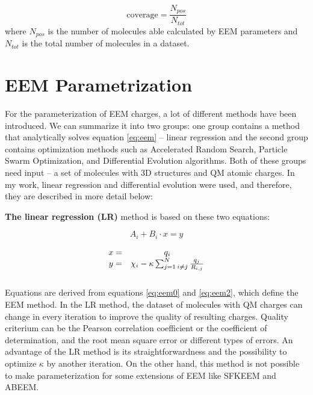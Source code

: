 \begin{equation}
    \mathrm{coverage} = \frac{N_{pos}}{N_{tot}}
\end{equation}
where $N_{pos}$ is the number of molecules able calculated by EEM parameters
and $N_{tot}$ is the total number of molecules in a dataset.

\section{EEM Parametrization}

For the parameterization of EEM charges, a lot of different methods have been
introduced. We can summarize it into two groups: one group contains
a method that analytically solves equation \ref{eq:eem} -- linear
regression \cite{Svobodova2007, Jirouskova2009} and the
second group contains optimization methods \cite{Ouyang2009}  such as
Accelerated Random Search, Particle Swarm Optimization, and Differential
Evolution algorithms. Both of these groups need input -- a set of molecules
with 3D structures and QM atomic charges. In my work, linear regression and
differential evolution were used, and therefore, they are described in more
detail below:

\textbf{The linear regression (LR)} method is based on these two equations:

\begin{equation} \label{eq:eem1}
    A_i + B_i \cdot x = y
\end{equation}

\begin{equation} \label{eq:eem2}
    \begin{array}{cc}
    x =& q_i \\
    \vspace{3mm}
    y =& \chi_i - \kappa \sum^N_{j=1 \: i\neq{j}} \frac{q_j}{R_{i,j}} \\
    \end{array}
\end{equation}

Equations are derived from equations \ref{eq:eem0} and \ref{eq:eem2}, which
define the EEM method. In the LR method, the dataset of molecules with QM
charges can change in every iteration to improve the quality of resulting
charges. Quality criterium can be the Pearson correlation coefficient or
the coefficient of determination, and the root mean square error or different
types of errors.  An advantage of the LR method is its straightforwardness and
the possibility to optimize $\kappa$ by another iteration. On the other hand,
this method is not possible to make pa\-ra\-me\-teri\-za\-tion for some extensions of EEM
like SFKEEM and ABEEM.

